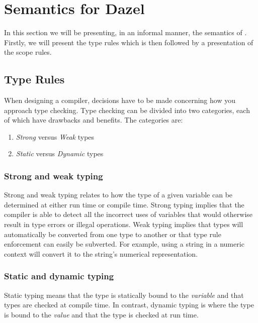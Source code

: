 \section{Semantics for Dazel} \label{sec:semantics}

In this section we will be presenting, in an informal manner, the semantics of \dazel{}.
Firstly, we will present the type rules which is then followed by a presentation of the scope rules.

\subsection{Type Rules}

When designing a compiler, decisions have to be made concerning how you approach type checking.
Type checking can be divided into two categories, each of which have drawbacks and benefits. The categories are:

\begin{enumerate}
    \item \textit{Strong} versus \textit{Weak} types
    \item \textit{Static} versus \textit{Dynamic} types
\end{enumerate}

\subsubsection*{Strong and weak typing}
Strong and weak typing relates to how the type of a given variable can be determined at either run time or compile time.
Strong typing implies that the compiler is able to detect all the incorrect uses of variables that would otherwise result in type errors or illegal operations.
Weak typing implies that types will automatically be converted from one type to another or that type rule enforcement can easily be subverted.
For example, using a string in a numeric context will convert it to the string's numerical representation\cite{sebesta_concepts_2016}.

\subsubsection*{Static and dynamic typing}
Static typing means that the type is statically bound to the \emph{variable} and that types are checked at compile time.
In contrast, dynamic typing is where the type is bound to the \emph{value} and that the type is checked at run time\cite{sebesta_concepts_2016}.

